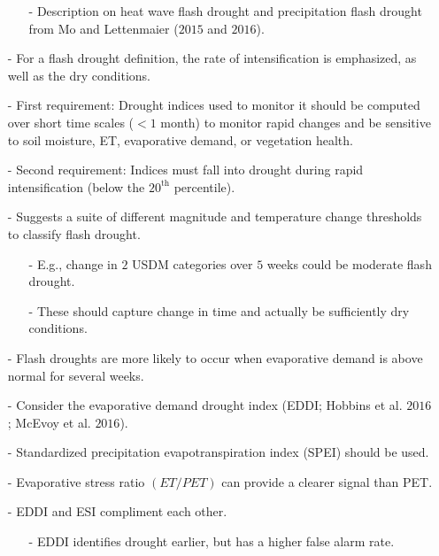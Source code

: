 \documentclass[12pt, letterpaper]{article}
\begin{document}
\begin{itemize}
        \begin{itemize}
        	\item[-] Description on heat wave flash drought and precipitation flash drought from
        	         Mo and Lettenmaier ($2015$ and $2016$).
        \end{itemize}
        \item[-] For a flash drought definition, the rate of intensification is emphasized, as well
                 as the dry conditions.
        \par
        \item[-] First requirement: Drought indices used to monitor it should be computed over short
                 time scales ($< 1$ month) to monitor rapid changes and be sensitive to soil moisture,
                 ET, evaporative demand, or vegetation health.
        \item[-] Second requirement: Indices must fall into drought during rapid intensification (below
                 the $20^{\text{th}}$ percentile).
        \par
        \item[-] Suggests a suite of different magnitude and temperature change thresholds to classify
                 flash drought.
        \begin{itemize}
        	\item[-] E.g., change in $2$ USDM categories over $5$ weeks could be moderate flash drought.
        	\item[-] These should capture change in time and actually be sufficiently dry conditions.
        \end{itemize}
        \item[-] Flash droughts are more likely to occur when evaporative demand is above normal for
                 several weeks.
        \item[-] Consider the evaporative demand drought index (EDDI; Hobbins et al. $2016$; 
                 McEvoy et al. $2016$).
        \item[-] Standardized precipitation evapotranspiration index (SPEI) should be used.
        \item[-] Evaporative stress ratio $\left( ET/PET \right)$ can provide a clearer signal than PET.
        \item[-] EDDI and ESI compliment each other.
        \begin{itemize}
        	\item[-] EDDI identifies drought earlier, but has a higher false alarm rate.
        \end{itemize}

\end{itemize}
\end{document}
